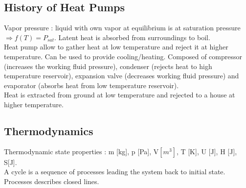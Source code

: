 \documentclass[../main.tex]{subfiles}
\begin{document}
\localtableofcontents

\subsection{History of Heat Pumps}
Vapor pressure : liquid with own vapor at equilibrium is at saturation pressure $\Rightarrow f(T) = P_{sat}$. Latent heat is absorbed from surroundings to boil.\\
Heat pump allow to gather heat at low temperature and reject it at higher temperature. Can be used to provide cooling/heating. Composed of compressor (increases the working fluid pressure), condenser (rejects heat to high temperature reservoir), expansion valve (decreases working fluid pressure) and evaporator (absorbs heat from low temperature reservoir).\\
Heat is extracted from ground at low temperature and rejected to a house at higher temperature. \\

\subsection{Thermodynamics}
Thermodynamic state properties : m [kg], p [Pa], V$[m^3]$, T [K], U [J], H [J], S[J].\\
A cycle is a sequence of processes leading the system back to initial state. Processes describes closed lines.\\
\end{document}
